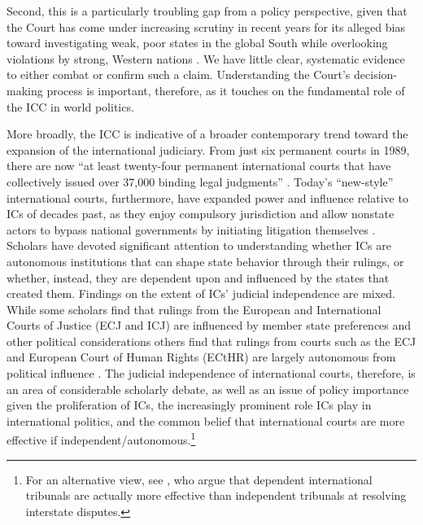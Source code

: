 Second, this is a particularly troubling gap from a policy perspective, given that the Court has come under increasing scrutiny in recent years for its alleged bias toward investigating weak, poor states in the global South while overlooking violations by strong, Western nations \citep{murithi2012international}. We have little clear, systematic evidence to either combat or confirm such a claim. Understanding the Court's decision-making process is important, therefore, as it touches on the fundamental role of the ICC in world politics. 

More broadly, the ICC is indicative of a broader contemporary trend toward the expansion of the international judiciary. From just six permanent courts in 1989, there are now ``at least twenty-four permanent international courts that have collectively issued over 37,000 binding legal judgments'' \citep[68]{alter2014new}. Today’s ``new-style'' international courts, furthermore, have expanded power and influence relative to ICs of decades past, as they enjoy compulsory jurisdiction and allow nonstate actors to bypass national governments by initiating litigation themselves \citep{alter2014new}. Scholars have devoted significant attention to understanding whether ICs are autonomous institutions that can shape state behavior through their rulings, or whether, instead, they are dependent upon and influenced by the states that created them. Findings on the extent of ICs' judicial independence are mixed. While some scholars find that rulings from the European and International Courts of Justice (ECJ and ICJ) are influenced by member state preferences and other political considerations \citep{carrubba2008judicial, garrett1998european, larsson2016judicial, posner2005judicial} others find that rulings from courts such as the ECJ and European Court of Human Rights (ECtHR) are largely autonomous from political influence \citep{alter1998masters, alter2008agents, sweet2012european, voeten2008impartiality}. The judicial independence of international courts, therefore, is an area of considerable scholarly debate, as well as an issue of policy importance given the proliferation of ICs, the increasingly prominent role ICs play in international politics, and the common belief that international courts are more effective if independent/autonomous.\footnote{For an alternative view, see \citet{posner2005judicial}, who argue that dependent international tribunals are actually more effective than independent tribunals at resolving interstate disputes.}  


